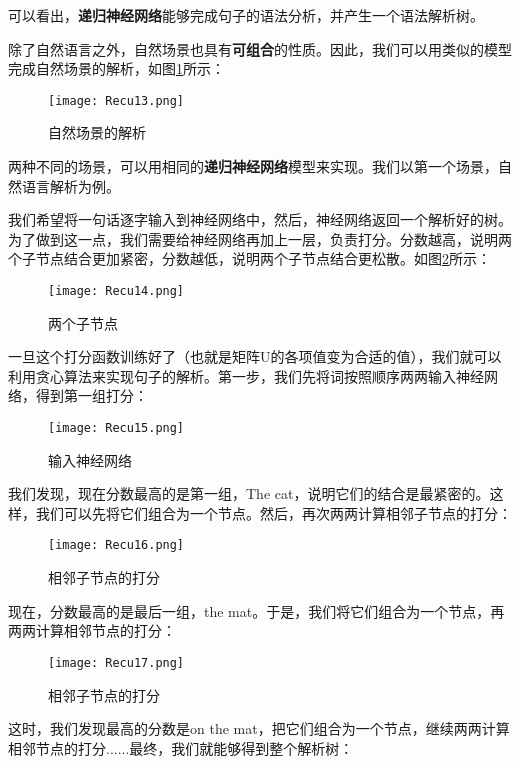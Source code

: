 可以看出，\textbf{递归神经网络}能够完成句子的语法分析，并产生一个语法解析树。

除了自然语言之外，自然场景也具有\textbf{可组合}的性质。因此，我们可以用类似的模型完成自然场景的解析，如图\ref{fig:Recu13}所示：

\begin{figure}[!h]
	\centering
	\texttt{[image: Recu13.png]}
	\caption{自然场景的解析}
	\label{fig:Recu13}
\end{figure}

两种不同的场景，可以用相同的\textbf{递归神经网络}模型来实现。我们以第一个场景，自然语言解析为例。

我们希望将一句话逐字输入到神经网络中，然后，神经网络返回一个解析好的树。为了做到这一点，我们需要给神经网络再加上一层，负责打分。分数越高，说明两个子节点结合更加紧密，分数越低，说明两个子节点结合更松散。如图\ref{fig:Recu14}所示：

\begin{figure}[!h]
	\centering
	\texttt{[image: Recu14.png]}
	\caption{两个子节点}
	\label{fig:Recu14}
\end{figure}

一旦这个打分函数训练好了（也就是矩阵U的各项值变为合适的值），我们就可以利用贪心算法来实现句子的解析。第一步，我们先将词按照顺序两两输入神经网络，得到第一组打分：

\begin{figure}[!h]
	\centering
	\texttt{[image: Recu15.png]}
	\caption{输入神经网络}
	\label{fig:Recu15}
\end{figure}

我们发现，现在分数最高的是第一组，The cat，说明它们的结合是最紧密的。这样，我们可以先将它们组合为一个节点。然后，再次两两计算相邻子节点的打分：

\begin{figure}[!h]
	\centering
	\texttt{[image: Recu16.png]}
	\caption{相邻子节点的打分}
	\label{fig:Recu16}
\end{figure}

现在，分数最高的是最后一组，the mat。于是，我们将它们组合为一个节点，再两两计算相邻节点的打分：

\begin{figure}[!h]
	\centering
	\texttt{[image: Recu17.png]}
	\caption{相邻子节点的打分}
	\label{fig:Recu17}
\end{figure}

这时，我们发现最高的分数是on the mat，把它们组合为一个节点，继续两两计算相邻节点的打分......最终，我们就能够得到整个解析树：

